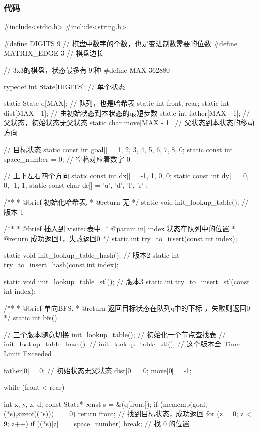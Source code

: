 \subsubsection{代码}
\begin{Codex}[label=eight_digits_bfs.c]
#include<stdio.h>
#include<string.h>

#define DIGITS 9 // 棋盘中数字的个数，也是变进制数需要的位数
#define     MATRIX_EDGE 3       // 棋盘边长

// 3x3的棋盘，状态最多有 9!种
#define     MAX         362880

typedef int State[DIGITS]; // 单个状态

static State q[MAX]; // 队列，也是哈希表
static int front, rear;
static int dist[MAX - 1]; // 由初始状态到本状态的最短步数
static int father[MAX - 1]; // 父状态，初始状态无父状态
static char move[MAX - 1]; // 父状态到本状态的移动方向

// 目标状态
static const int goal[] = {1, 2, 3, 4, 5, 6, 7, 8, 0};
static const int space_number = 0; // 空格对应着数字 0

// 上下左右四个方向
static const int dx[] = {-1, 1, 0, 0};
static const int dy[] = {0, 0, -1, 1};
static const char dc[] = { 'u', 'd', 'l', 'r' };

/**
 * @brief 初始化哈希表.
 * @return 无
 */
static void init_lookup_table(); // 版本 1

/**
 * @brief 插入到 visited表中.
 * @param[in] index 状态在队列中的位置
 * @return 成功返回1，失败返回0
 */
static int try_to_insert(const int index);

static void init_lookup_table_hash(); // 版本2
static int try_to_insert_hash(const int index);

static void init_lookup_table_stl(); // 版本3
static int try_to_insert_stl(const int index);

/**
 * @brief 单向BFS.
 * @return 返回目标状态在队列q中的下标 ，失败则返回0
 */
static int bfs() {
    // 三个版本随意切换
    init_lookup_table(); // 初始化一个节点查找表
    // init_lookup_table_hash();
    // init_lookup_table_stl(); // 这个版本会 Time Limit Exceeded
    
    father[0] = 0; // 初始状态无父状态
    dist[0] = 0;
    move[0] = -1;

    while (front < rear) {
        int x, y, z, d;
        const State* const s = &(q[front]);
        if (memcmp(goal, (*s),sizeof((*s))) == 0) {
            return front;  // 找到目标状态，成功返回
        }
        for (z = 0; z < 9; z++)  if ((*s)[z] == space_number) {
            break;  // 找 0 的位置
        }
        
}}
\end{Codex}
